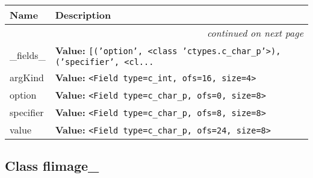     \vspace{-1cm}
\hspace{\varindent}\begin{longtable}{|p{\varnamewidth}|p{\vardescrwidth}|l}
\cline{1-2}
\cline{1-2} \centering \textbf{Name} & \centering \textbf{Description}& \\
\cline{1-2}
\endhead\cline{1-2}\multicolumn{3}{r}{\small\textit{continued on next page}}\\\endfoot\cline{1-2}
\endlastfoot\raggedright \_\-f\-i\-e\-l\-d\-s\-\_\- & \raggedright \textbf{Value:} 
{\tt \texttt{[}\texttt{(}\texttt{'}\texttt{option}\texttt{'}\texttt{, }{\textless}class 'ctypes.c\_char\_p'{\textgreater}\texttt{)}\texttt{, }\texttt{(}\texttt{'}\texttt{specifier}\texttt{'}\texttt{, }{\textless}cl\texttt{...}}&\\
\cline{1-2}
\raggedright a\-r\-g\-K\-i\-n\-d\- & \raggedright \textbf{Value:} 
{\tt {\textless}Field type=c\_int, ofs=16, size=4{\textgreater}}&\\
\cline{1-2}
\raggedright o\-p\-t\-i\-o\-n\- & \raggedright \textbf{Value:} 
{\tt {\textless}Field type=c\_char\_p, ofs=0, size=8{\textgreater}}&\\
\cline{1-2}
\raggedright s\-p\-e\-c\-i\-f\-i\-e\-r\- & \raggedright \textbf{Value:} 
{\tt {\textless}Field type=c\_char\_p, ofs=8, size=8{\textgreater}}&\\
\cline{1-2}
\raggedright v\-a\-l\-u\-e\- & \raggedright \textbf{Value:} 
{\tt {\textless}Field type=c\_char\_p, ofs=24, size=8{\textgreater}}&\\
\cline{1-2}
\end{longtable}



\subsection{Class flimage\_}

